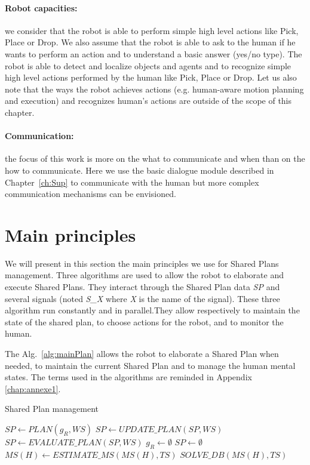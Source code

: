 \documentclass[english,a4paper,11pt,twoside]{StyleThese}
\begin{document}
\paragraph{Robot capacities:} we consider that the robot is able to perform simple high level actions like Pick, Place or Drop. We also assume that the robot is able to ask to the human if he wants to perform an action and to understand a basic answer (yes/no type). 
The robot is able to detect and localize objects and agents
and to recognize simple high level actions performed by the human like Pick, Place or Drop. Let us also note that the ways the robot achieves actions (e.g. human-aware motion planning and execution) and recognizes human's actions are outside of the scope of this chapter.

\paragraph{Communication:} the focus of this work is more on the what to communicate and when than on the how to communicate. Here we use the basic dialogue module described in Chapter~\ref{ch:Sup} to communicate with the human but more complex communication mechanisms can be envisioned. 

\section{Main principles}

We will present in this section the main principles we use for Shared Plans management. Three algorithms are used to allow the robot to elaborate and execute Shared Plans.  They interact through the Shared Plan data \textit{SP} and several signals (noted \textit{S\_X} where \textit{X} is the name of the signal). These three algorithm run constantly and in parallel.They allow respectively to maintain the state of the shared plan, to choose actions for the robot, and to monitor the human.

The Alg.~\ref{alg:mainPlan} allows the robot to elaborate a Shared Plan when needed, to maintain the current Shared Plan and to manage the human mental states. The terms used in the algorithms are reminded in Appendix \ref{chap:annexe1}.

\begin{algorithm}
\caption{Shared Plan management}
\label{alg:mainPlan}
\begin{algorithmic}
\STATE $SP \leftarrow PLAN(g_R, WS)$
\ENDIF
{}
\STATE $SP \leftarrow UPDATE\_PLAN(SP, WS)$
\ENDIF
{}
\STATE $SP \leftarrow EVALUATE\_ PLAN(SP, WS)$
\ENDIF
{}
\STATE $g_R \leftarrow \emptyset$ 
\STATE $SP \leftarrow \emptyset$
\ENDIF
{}
\STATE $MS(H) \leftarrow ESTIMATE\_MS(MS(H), TS)$
\STATE $SOLVE\_DB(MS(H), TS)$
\ENDIF
\ENDIF
\ENDWHILE
\end{algorithmic}
\end{algorithm} 
\end{document}
